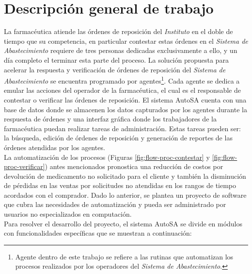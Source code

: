 \section{Descripción general de trabajo}\label{sec:desc-general}
La farmacéutica atiende las órdenes de reposición del \textit{Instituto} en el doble de tiempo que su competencia, en particular contestar estas órdenes en el \textit{Sistema de Abastecimiento} requiere de tres personas dedicadas exclusivamente a ello, y un día completo el terminar esta parte del proceso. La solución propuesta para acelerar la respuesta y verificación de órdenes de reposición del \textit{Sistema de Abastecimiento} se encuentra programado por agentes\footnote{Agente dentro de este trabajo se refiere a las rutinas que automatizan los procesos realizados por los operadores del \textit{Sistema de Abastecimiento}.}. Cada agente se dedica a emular las acciones del operador de la farmacéutica, el cual es el responsable de contestar o verificar las órdenes de reposición. El sistema AutoSA cuenta con una base de datos donde se almacenen los datos capturados por los agentes durante la respuesta de órdenes y una interfaz gráfica donde los trabajadores de la farmacéutica puedan realizar tareas de administración. Estas tareas pueden ser: la búsqueda, edición de órdenes de reposición y generación de reportes de las órdenes atendidas por los agentes.\\
La automatización de los procesos (Figuras \ref{fig:flow-proc-contestar} y \ref{fig:flow-proc-verificar}) antes mencionados pronostica una reducción de costos por devolución de medicamento no solicitado para el cliente y también la disminución de pérdidas en las ventas por solicitudes no atendidas en los rangos de tiempo acordados con el comprador. Dado lo anterior, se plantea un proyecto de software que cubra las necesidades de automatización y pueda ser administrado por usuarios no especializados en computación.\\
Para resolver el desarrollo del proyecto, el sistema AutoSA se divide en módulos con funcionalidades específicas que se muestran a continuación:
\pagebreak
